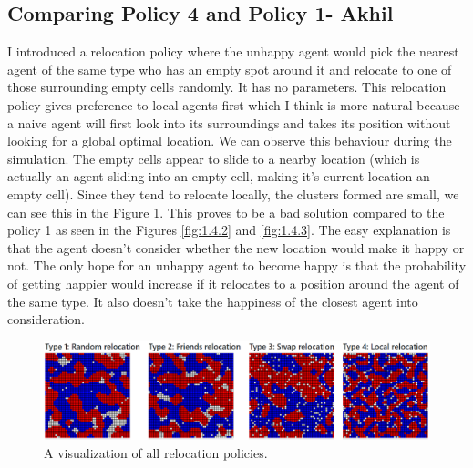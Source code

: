 \documentclass[a4paper,12pt]{article}
\begin{document}
  \newpage
  \subsection{Comparing Policy 4 and Policy 1- Akhil}
  I introduced a relocation policy where the unhappy agent would pick the nearest agent of the same type who has an empty spot around it and relocate to one of those surrounding empty cells randomly. It has no parameters. This relocation policy gives preference to local agents first which I think is more natural because a naive agent will first look into its surroundings and takes its position without looking for a global optimal location. We can observe this behaviour during the simulation. The empty cells appear to slide to a nearby location (which is actually an agent sliding into an empty cell, making it's current location an empty cell). Since they tend to relocate locally, the clusters formed are small, we can see this in the Figure \ref{fig:1.4.1}. This proves to be a bad solution compared to the policy 1 as seen in the Figures \ref{fig:1.4.2} and \ref{fig:1.4.3}. The easy explanation is that the agent doesn't consider whether the new location would make it happy or not. The only hope for an unhappy agent to become happy is that the probability of getting happier would increase if it relocates to a position around the agent of the same type. It also doesn't take the happiness of the closest agent into consideration.

  \begin{figure}[ht]
    \centering
    \includegraphics[width=0.99\linewidth]{allVisuals.PNG}
    \caption{A visualization of all relocation policies.}
    \label{fig:1.4.1}
  \end{figure}
\end{document}
